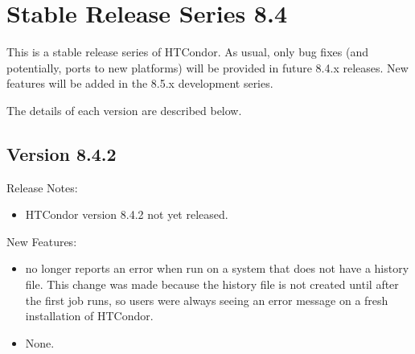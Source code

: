 
\section{\label{sec:History-8-4}Stable Release Series 8.4}

This is a stable release series of HTCondor.
As usual, only bug fixes (and potentially, ports to new platforms)
will be provided in future 8.4.x releases.
New features will be added in the 8.5.x development series.

The details of each version are described below.

\subsection*{\label{sec:New-8-4-2}Version 8.4.2}

\noindent Release Notes:

\begin{itemize}

\item HTCondor version 8.4.2 not yet released.

\end{itemize}


\noindent New Features:

\begin{itemize}

\item {} no longer reports an error when run on a system that does not have a history file.
This change was made because the history file is not created until after the first job runs, so users
were always seeing an error message on a fresh installation of HTCondor.

\item None.

\end{itemize}

